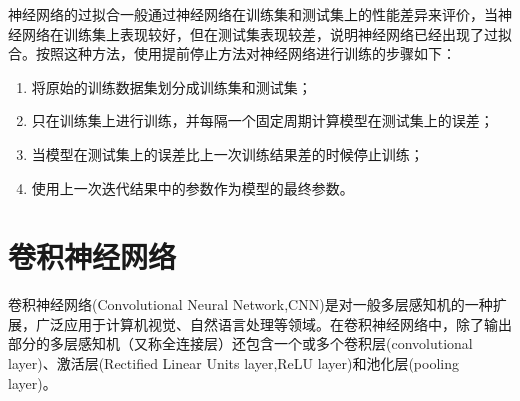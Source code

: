 \documentclass[a4paper]{ctexart}
\begin{document}
\begin{spacing}{1.3}
	神经网络的过拟合一般通过神经网络在训练集和测试集上的性能差异来评价，当神经网络在训练集上表现较好，但在测试集表现较差，说明神经网络已经出现了过拟合。按照这种方法，使用提前停止方法对神经网络进行训练的步骤如下：
	\begin{enumerate}[itemindent=2em,label=(\arabic*)]
		\item 将原始的训练数据集划分成训练集和测试集；
		\item 只在训练集上进行训练，并每隔一个固定周期计算模型在测试集上的误差；
		\item 当模型在测试集上的误差比上一次训练结果差的时候停止训练；
		\item 使用上一次迭代结果中的参数作为模型的最终参数。
	\end{enumerate}

	\section{卷积神经网络}
	卷积神经网络(Convolutional Neural Network,CNN)是对一般多层感知机的一种扩展，广泛应用于计算机视觉、自然语言处理等领域\cite{RN137}。在卷积神经网络中，除了输出部分的多层感知机（又称全连接层）还包含一个或多个卷积层(convolutional layer)、激活层(Rectified Linear Units layer,ReLU layer)和池化层(pooling layer)\cite{RN136}。

\end{spacing}
\end{document}
